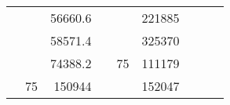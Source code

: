 \begin{table}[H]
\begin{tabular}{|ccrccrccc}
\multicolumn{1}{|c|}{\cellcolor[HTML]{FFFFC7}}                                & \multicolumn{1}{c|}{\cellcolor[HTML]{DAE8FC}}                      & \multicolumn{1}{r|}{\cellcolor[HTML]{DAE8FC}56660.6}   & \multicolumn{1}{c|}{\cellcolor[HTML]{FFFFC7}}                                & \multicolumn{1}{c|}{\cellcolor[HTML]{DAE8FC}}                       & \multicolumn{1}{r|}{\cellcolor[HTML]{DDFDFF}221885}    &                                                                              &                                                                    &                                                        \\ \cline{3-3} \cline{6-6}
\multicolumn{1}{|c|}{\cellcolor[HTML]{FFFFC7}}                                & \multicolumn{1}{c|}{\cellcolor[HTML]{DAE8FC}}                      & \multicolumn{1}{r|}{\cellcolor[HTML]{DDFDFF}58571.4}   & \multicolumn{1}{c|}{\cellcolor[HTML]{FFFFC7}}                                & \multicolumn{1}{c|}{\cellcolor[HTML]{DAE8FC}}                       & \multicolumn{1}{r|}{\cellcolor[HTML]{DAE8FC}325370}    &                                                                              &                                                                    &                                                        \\ \cline{3-3} \cline{6-6}
\multicolumn{1}{|c|}{\cellcolor[HTML]{FFFFC7}}                                & \multicolumn{1}{c|}{\cellcolor[HTML]{DAE8FC}}                      & \multicolumn{1}{r|}{\cellcolor[HTML]{DAE8FC}74388.2}   & \multicolumn{1}{c|}{\cellcolor[HTML]{FFFFC7}}                                & \multicolumn{1}{c|}{\multirow{-10}{*}{\cellcolor[HTML]{DAE8FC}75}}  & \multicolumn{1}{r|}{\cellcolor[HTML]{DDFDFF}111179}    &                                                                              &                                                                    &                                                        \\ \cline{3-3} \cline{5-6}
\multicolumn{1}{|c|}{\cellcolor[HTML]{FFFFC7}}                                & \multicolumn{1}{c|}{\multirow{-10}{*}{\cellcolor[HTML]{DAE8FC}75}} & \multicolumn{1}{r|}{\cellcolor[HTML]{DDFDFF}150944}    & \multicolumn{1}{c|}{\cellcolor[HTML]{FFFFC7}}                                & \multicolumn{1}{c|}{\cellcolor[HTML]{DDFDFF}}                       & \multicolumn{1}{r|}{\cellcolor[HTML]{DAE8FC}152047}    &                                                                              &                                                                    &                                                        \\ \cline{2-3} \cline{6-6}

\end{tabular}
\end{table}

